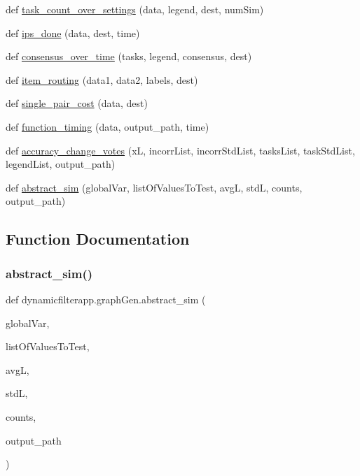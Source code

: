 \begin{DoxyCompactItemize}
\item 
def \hyperlink{namespacedynamicfilterapp_1_1graph_gen_a29b3308a8c942d63d818e0ac5fea6920}{task\+\_\+count\+\_\+over\+\_\+settings} (data, legend, dest, num\+Sim)
\item 
def \hyperlink{namespacedynamicfilterapp_1_1graph_gen_a94b7f314ce8dfce16b7776cba4129992}{ips\+\_\+done} (data, dest, time)
\item 
def \hyperlink{namespacedynamicfilterapp_1_1graph_gen_ae4d60fdc4756e001059acb14cbb6821c}{consensus\+\_\+over\+\_\+time} (tasks, legend, consensus, dest)
\item 
def \hyperlink{namespacedynamicfilterapp_1_1graph_gen_a9e34d7128010818130474df31fac89c5}{item\+\_\+routing} (data1, data2, labels, dest)
\item 
def \hyperlink{namespacedynamicfilterapp_1_1graph_gen_a09e4e7b19b279838511f1806d4f7f2bd}{single\+\_\+pair\+\_\+cost} (data, dest)
\item 
def \hyperlink{namespacedynamicfilterapp_1_1graph_gen_a829d8f63431b6a26381a167956e0c3a2}{function\+\_\+timing} (data, output\+\_\+path, time)
\item 
def \hyperlink{namespacedynamicfilterapp_1_1graph_gen_ab75745d1f7f725285dba82b7e5d27e50}{accuracy\+\_\+change\+\_\+votes} (xL, incorr\+List, incorr\+Std\+List, tasks\+List, task\+Std\+List, legend\+List, output\+\_\+path)
\item 
def \hyperlink{namespacedynamicfilterapp_1_1graph_gen_a19198a79ec71a19f9461487769b622f8}{abstract\+\_\+sim} (global\+Var, list\+Of\+Values\+To\+Test, avgL, stdL, counts, output\+\_\+path)
\end{DoxyCompactItemize}


\subsection{Function Documentation}
\mbox{\label{namespacedynamicfilterapp_1_1graph_gen_a19198a79ec71a19f9461487769b622f8}} 
\subsubsection{\texorpdfstring{abstract\+\_\+sim()}{abstract\_sim()}}
{\footnotesize\ttfamily def dynamicfilterapp.\+graph\+Gen.\+abstract\+\_\+sim (\begin{DoxyParamCaption}\item[{}]{global\+Var,  }\item[{}]{list\+Of\+Values\+To\+Test,  }\item[{}]{avgL,  }\item[{}]{stdL,  }\item[{}]{counts,  }\item[{}]{output\+\_\+path }\end{DoxyParamCaption})}

